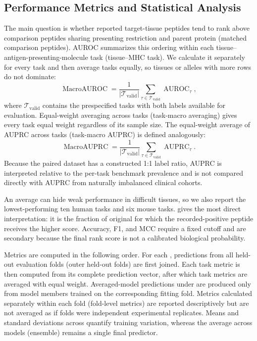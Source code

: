 \subsection{Performance Metrics and Statistical Analysis}

The main question is whether reported target-tissue peptides tend to rank above comparison peptides sharing presenting restriction and parent protein (matched comparison peptides). AUROC summarizes this ordering within each tissue--antigen-presenting-molecule task (tissue--MHC task). We calculate it separately for every task and then average tasks equally, so tissues or alleles with more rows do not dominate:
\[
\operatorname{MacroAUROC}
=
\frac{1}{|\mathcal{T}_{\mathrm{valid}}|}
\sum_{\tau\in\mathcal{T}_{\mathrm{valid}}}
\operatorname{AUROC}_{\tau},
\]
where \(\mathcal{T}_{\mathrm{valid}}\) contains the prespecified tasks with both labels available for evaluation. Equal-weight averaging across tasks (task-macro averaging) gives every task equal weight regardless of its sample size. The equal-weight average of AUPRC across tasks (task-macro AUPRC) is defined analogously:
\[
\operatorname{MacroAUPRC}
=
\frac{1}{|\mathcal{T}_{\mathrm{valid}}|}
\sum_{\tau\in\mathcal{T}_{\mathrm{valid}}}
\operatorname{AUPRC}_{\tau}.
\]
Because the paired dataset has a constructed 1:1 label ratio, AUPRC is interpreted relative to the per-task benchmark prevalence and is not compared directly with AUPRC from naturally imbalanced clinical cohorts.

An average can hide weak performance in difficult tissues, so we also report the lowest-performing ten human tasks and six mouse tasks. \plainPairAcc{} gives the most direct interpretation: it is the fraction of original \plainMatchedPairs{} for which the recorded-positive peptide receives the higher score. Accuracy, F1, and MCC require a fixed cutoff and are secondary because the final rank score is not a calibrated biological probability.

Metrics are computed in the following order. For each \plainSeed{}, predictions from all held-out evaluation folds (outer held-out folds) are first joined. Each task metric is then computed from its complete \plainOOF{} prediction vector, after which task metrics are averaged with equal weight. Averaged-model predictions under \plainPeptideOOF{} are produced only from model members trained on the corresponding fitting fold. Metrics calculated separately within each fold (fold-level metrics) are reported descriptively but are not averaged as if folds were independent experimental replicates. Means and standard deviations across \plainSeeds{} quantify training variation, whereas the average across models (ensemble) remains a single final predictor.

